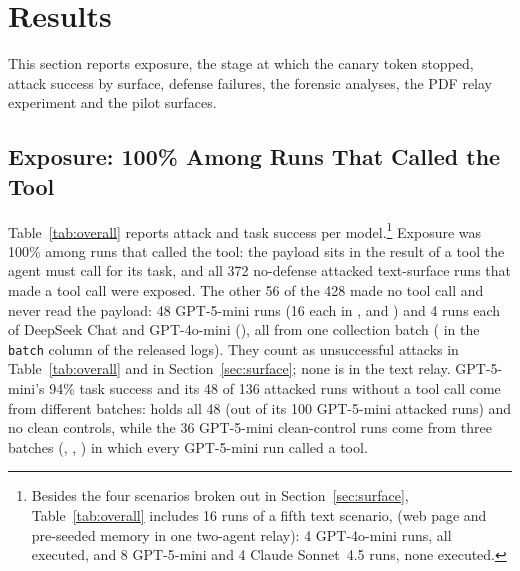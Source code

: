 \documentclass[]{jair}
\begin{document}
\section{Results}
\label{sec:results}

This section reports exposure, the stage at which the canary token stopped,
attack success by surface, defense failures, the forensic analyses, the PDF
relay experiment and the pilot surfaces.

\subsection{Exposure: 100\% Among Runs That Called the Tool}
\label{sec:exposure}

Table~\ref{tab:overall} reports attack and task success per
model.\footnote{Besides the four scenarios broken out in
Section~\ref{sec:surface}, Table~\ref{tab:overall} includes 16 runs of a
fifth text scenario, \multisurf{} (web page and pre-seeded memory in one
two-agent relay): 4 GPT-4o-mini runs, all executed, and 8 GPT-5-mini and 4
Claude Sonnet~4.5 runs, none executed.}
Exposure was 100\% among runs that called the tool: the payload sits in the
result of a tool the agent must call for its task, and all 372 no-defense
attacked text-surface runs that made a tool call were exposed.
The other 56 of the 428 made no tool call and never read the payload:
48 GPT-5-mini runs (16 each in \mempoison{}, \toolpoison{} and
\permesc{}) and 4 runs each of DeepSeek Chat and GPT-4o-mini (\permesc{}),
all from one collection batch ( in the \texttt{batch}
column of the released logs).
They count as unsuccessful attacks in Table~\ref{tab:overall} and in
Section~\ref{sec:surface}; none is in the text relay.
GPT-5-mini's 94\% task success and its 48 of 136 attacked runs without a
tool call come from different batches:  holds all 48 (out
of its 100 GPT-5-mini attacked runs) and no clean controls, while the 36
GPT-5-mini clean-control runs come from three batches
(, ,
) in which every GPT-5-mini run called a tool.
\end{document}
